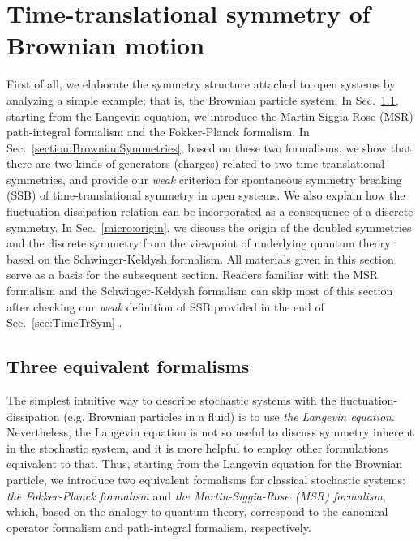 \documentclass[a4paper,11pt]{article}
\begin{document}
\section{Time-translational symmetry of Brownian motion}
\label{section:TT} 

First of all, we elaborate the symmetry structure 
attached to open systems by analyzing a simple example; 
that is, the Brownian particle system. 
In Sec.~\ref{section:ClassicalBrownian}, 
starting from the Langevin equation,
we introduce the Martin-Siggia-Rose (MSR) 
path-integral formalism and the Fokker-Planck formalism. 
In Sec.~\ref{section:BrownianSymmetries}, based on these two formalisms, 
we show that there are two kinds of generators (charges) related to 
two time-translational symmetries, and provide our \textit{weak} criterion for 
spontaneous symmetry breaking (SSB) of time-translational symmetry 
in open systems. 
We also explain how the fluctuation dissipation relation can be incorporated 
as a consequence of a discrete symmetry. 
In Sec.~\ref{micro:origin}, we discuss the origin of the doubled symmetries 
and the discrete symmetry from the viewpoint of underlying quantum theory 
based on the Schwinger-Keldysh formalism.
All materials given in this section serve as a basis for the subsequent section.
Readers familiar with the MSR formalism and the Schwinger-Keldysh 
 formalism can skip most of this section after checking 
our \textit{weak} definition of SSB provided in the end of Sec.~\ref{sec:TimeTrSym}
.


\subsection{Three equivalent formalisms}
\label{section:ClassicalBrownian}
The simplest intuitive way to describe stochastic systems
with the fluctuation-dissipation (e.g. Brownian particles in a fluid) is 
to use \textit{the Langevin equation}.
Nevertheless, the Langevin equation is not so useful to discuss 
symmetry inherent in the stochastic system, and it is more helpful to 
employ other formulations equivalent to that.
Thus, starting from the Langevin equation for the Brownian particle, 
we introduce two equivalent formalisms for classical stochastic systems: 
\textit{the Fokker-Planck formalism} and 
\textit{the Martin-Siggia-Rose~(MSR) formalism}, 
which, based on the analogy to quantum theory, 
correspond to the canonical operator formalism 
and path-integral formalism, respectively.  
\end{document}
